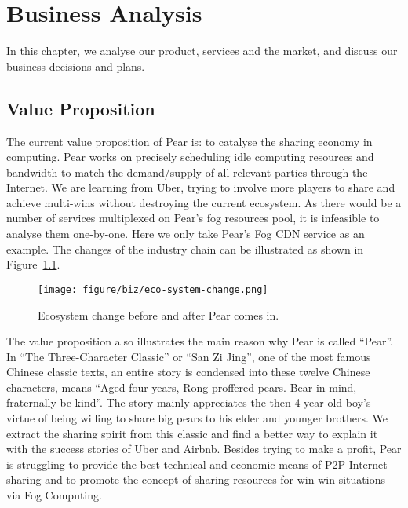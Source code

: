 \chapter{Business Analysis}\label{sec-biz-analysis}
In this chapter, we analyse our product, services and the market, and discuss our business decisions and plans. 

\section{Value Proposition}
The current value proposition of Pear is: to catalyse the sharing economy in computing. Pear works on precisely scheduling idle computing resources and bandwidth to match the demand/supply of all relevant parties through the Internet. We are learning from Uber, trying to involve more players to share and achieve multi-wins without destroying the current ecosystem. As there would be a number of services multiplexed on Pear's fog resources pool, it is infeasible to analyse them one-by-one. Here we only take Pear's Fog CDN service as an example. The changes of the industry chain can be illustrated as shown in Figure~\ref{fig:eco-sys-change}.
\begin{figure}[ht]
	\centering
	\texttt{[image: figure/biz/eco-system-change.png]}
	\caption{Ecosystem change before and after Pear comes in.} \label{fig:eco-sys-change}
\end{figure}

The value proposition also illustrates the main reason why Pear is called ``Pear''. In ``The Three-Character Classic'' or ``San Zi Jing'', one of the most famous Chinese classic texts, an entire story is condensed into these twelve Chinese characters, means ``Aged four years, Rong proffered pears. Bear in mind, fraternally be kind''. The story mainly appreciates the then 4-year-old boy's virtue of being willing to share big pears to his elder and younger brothers. We extract the sharing spirit from this classic and find a better way to explain it with the success stories of Uber and Airbnb. Besides trying to make a profit, Pear is struggling to provide the best technical and economic means of P2P Internet sharing and to promote the concept of sharing resources for win-win situations via Fog Computing. 
